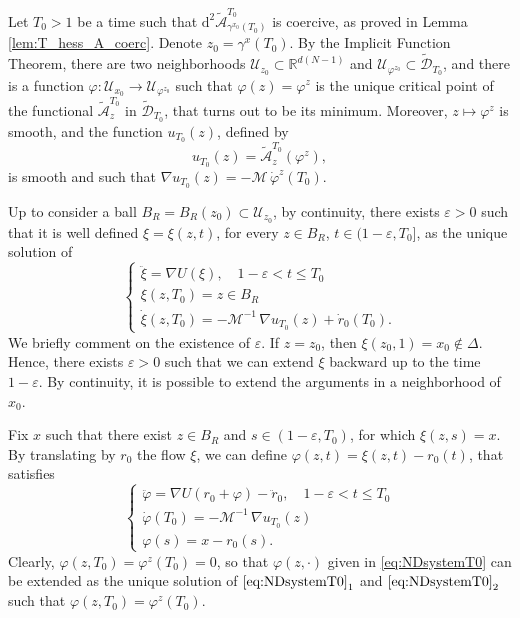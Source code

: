 \documentclass[a4paper,10pt]{amsart}
\newcommand{\numberset}{\mathbb}
\newcommand{\R}{\numberset{R}}
\newcommand{\ud}{\mathrm{d}}
\theoremstyle{plain}
\theoremstyle{definition}
\numberwithin{equation}{section}
\numberwithin{thm}{section}
\begin{document}
Let $T_0>1$ be a time such that $\ud^2 \tilde{\mathcal{A}}_{\gamma^{x_0}(T_0)}^{T_0}$ is coercive, as proved in Lemma \ref{lem:T_hess_A_coerc}. Denote $z_0=\gamma^x(T_0)$. By the Implicit Function Theorem, there are two neighborhoods $\mathcal{U}_{z_0}\subset\R^{d(N-1)}$ and $\mathcal U_{\varphi^{z_0}}\subset\tilde{\mathcal {D}}_{T_0}$, and there is a function $\varphi:\mathcal{U}_{x_0}\rightarrow \mathcal U_{\varphi^{z_0}}$ such that $\varphi(z)=\varphi^z$ is the unique critical point of the functional $\tilde{\mathcal A}_{z}^{T_0}$ in $\tilde{\mathcal{D}}_{T_0}$, that turns out to be its minimum. Moreover, $z \mapsto \varphi^z$ is smooth, and the function $u_{T_0}(z)$, defined by
\[
u_{T_0}(z)=\tilde{\mathcal{A}}_{z}^{T_0}(\varphi^z),
\]
is smooth and such that 
$\nabla u_{T_0}(z)=-\mathcal M\,\dot \varphi^z(T_0)$. 

Up to consider a ball $B_R=B_{R}(z_0) \subset \mathcal U_{z_0}$, by continuity, there exists $\varepsilon>0$ such that it is well defined 
$\xi=\xi(z,t)$, for every $z \in  B_R$, $t\in (1-\varepsilon, T_0]$, as the unique solution of
\begin{equation}\label{eq:system_xi}
\begin{cases}
    \ddot\xi = \nabla U(\xi),\quad 1-\varepsilon<t \le T_0\\
    \xi(z,T_0) = z \in {B}_R\\
    \dot\xi(z,T_0) = -\mathcal{M}^{-1}\,\nabla u_{T_0}(z) + \dot r_0(T_0).
\end{cases}
\end{equation}
We briefly comment on the existence of $\varepsilon$. If $z=z_0$,  then $\xi(z_0,1)=x_0 \notin \Delta$. Hence, there exists $\varepsilon>0$ such that we can extend $\xi$ backward up to the time $1-\varepsilon$. By continuity, it is possible to extend the arguments in a neighborhood of $x_0$.

\smallskip
Fix $x$ such that there exist $z \in B_R$ and $s \in (1-\varepsilon,T_0)$, for which $\xi(z,s)=x$. By translating by $r_0$ the flow $\xi$, we can define $\varphi(z,t) = \xi(z,t) - r_0(t)$, that satisfies
\begin{equation}
\label{eq:NDsystemT0}
\begin{cases}
\ddot{\varphi} = \nabla U(r_0+ \varphi)-\ddot r_0, \quad 1-\varepsilon < t \le T_0
    \\
    \dot {\varphi}(T_0) = -\mathcal{M}^{-1}\,\nabla u_{T_0}(z)
    \\
    \varphi(s) = x- r_0(s).
\end{cases}
\end{equation}
Clearly, $\varphi(z,T_0)=\varphi^z(T_0)=0$, so that $\varphi(z,\cdot)$ given in \eqref{eq:NDsystemT0}
 can be extended as the unique solution of $\eqref{eq:NDsystemT0}_1$ and $\eqref{eq:NDsystemT0}_2$ such that $\varphi(z,T_0)=\varphi^z(T_0)$.
 
\end{document}
